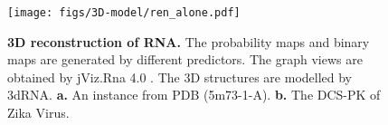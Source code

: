 \begin{figure}[t] %
\centering
\texttt{[image: figs/3D-model/ren\_alone.pdf]} 
\caption{\textbf{3D reconstruction of RNA.} The probability maps and binary maps are generated by different predictors. The graph views are obtained by jViz.Rna 4.0 \cite{shabash2017numerical}. The 3D structures are modelled by 3dRNA. \textbf{a.} An instance from PDB (5m73-1-A). \textbf{b.} The DCS-PK of Zika Virus.}
\label{Fig.3dmodel-ren}
\end{figure}

